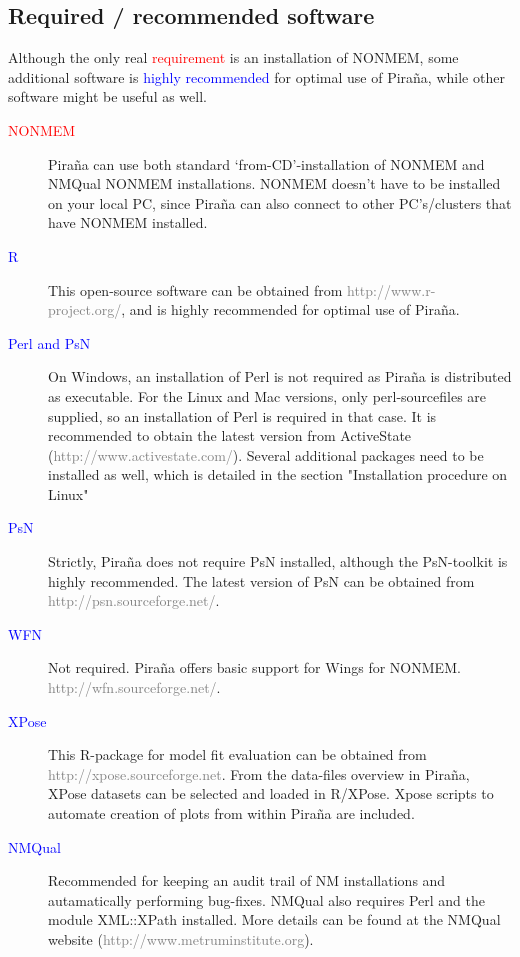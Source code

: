 \documentclass[a4,11pt]{report} \usepackage[pdftex]{graphicx}
\begin{document}
\subsection{Required / recommended software} Although the only real
\textcolor{Red}{requirement} is an installation of NONMEM, some
additional software is \textcolor{Blue}{highly recommended} for
optimal use of Pira\~na, while other software might be useful as well.
\begin{description}
\item[\textcolor{Red}{NONMEM}] Pira\~na can use both standard
  `from-CD'-installation of NONMEM and NMQual NONMEM
  installations. NONMEM doesn't have to be installed on your local PC,
  since Pira\~na can also connect to other PC's/clusters that have
  NONMEM installed.

\item[\textcolor{Blue}{R}] This open-source software can be
obtained from \textcolor{Grey}{http://www.r-project.org/}, and is highly
recommended for optimal use of Pira\~na.

\item[\textcolor{Blue}{Perl and PsN}] On Windows, an installation of
  Perl is not required as Pira\~na is distributed as executable. For
  the Linux and Mac versions, only perl-sourcefiles are supplied, so
  an installation of Perl is required in that case. It is recommended
  to obtain the latest version from ActiveState
  (\textcolor{Grey}{http://www.activestate.com/}). Several additional
  packages need to be installed as well, which is detailed in the
  section "Installation procedure on Linux"

\item[\textcolor{Blue}{PsN}] Strictly, Pira\~na does not require PsN
installed, although the PsN-toolkit is highly recommended. The latest
version of PsN can be obtained from
\textcolor{Grey}{http://psn.sourceforge.net/}.

\item[\textcolor{Blue}{WFN}] Not required. Pira\~na offers basic
  support for Wings for NONMEM. \textcolor{Grey}{http://wfn.sourceforge.net/}.

\item[\textcolor{Blue}{XPose}] This R-package for model fit evaluation
  can be obtained from
  \textcolor{Grey}{http://xpose.sourceforge.net}. From the data-files
  overview in Pira\~na, XPose datasets can be selected and loaded in
  R/XPose. Xpose scripts to automate creation of plots from within Pira\~na
  are included.

  \item[\textcolor{Blue}{NMQual}] Recommended for keeping an audit
trail of NM installations and autamatically performing bug-fixes. NMQual
also requires Perl and the module XML::XPath installed. More details
can be found at the NMQual website
(\textcolor{Grey}{http://www.metruminstitute.org}).
\end{description}
\end{document}
